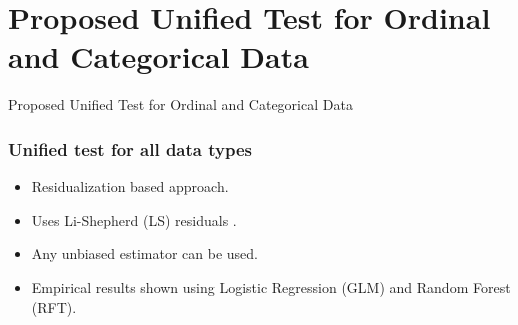 \documentclass{beamer}
\begin{document}


\section{Proposed Unified Test for Ordinal and Categorical Data}
\begin{frame}
	\begin{center} \Huge{Proposed Unified Test for Ordinal and Categorical Data} \end{center}
\end{frame}
\begin{frame}
	\frametitle{Unified test for all data types}
	\begin{itemize}
		\setlength\itemsep{1em}
		\item Residualization based approach.
		\item Uses Li-Shepherd (LS) residuals \footnotemark.
		\item Any unbiased estimator can be used.
		\item Empirical results shown using Logistic Regression (GLM) and Random Forest (RFT).
	\end{itemize}
\end{frame}
\end{document}
